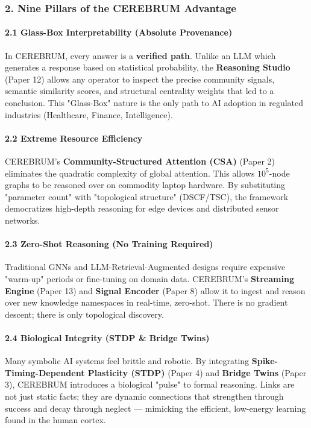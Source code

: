 \subsubsection{2. Nine Pillars of the CEREBRUM Advantage}

\paragraph{2.1 Glass-Box Interp\-retability (Absolute Provenance)}
In CEREBRUM, every answer is a \textbf{verified path}. Unlike an LLM which generates a response based on statistical probability, the \textbf{Reasoning Studio} (Paper 12) allows any operator to inspect the precise community signals, semantic similarity scores, and structural centrality weights that led to a conclusion. This "Glass-Box" nature is the only path to AI adoption in regulated industries (Healthcare, Finance, Intell\-igence).

\paragraph{2.2 Extreme Resource Efficiency}
CEREBRUM's \textbf{Community-Structured Attention (CSA)} (Paper 2) eliminates the quadratic complexity of global attention. This allows $10^5$-node graphs to be reasoned over on commodity laptop hardware. By subst\-ituting "parameter count" with "topological structure" (DSCF/TSC), the framework democ\-ratizes high-depth reasoning for edge devices and distributed sensor networks.

\paragraph{2.3 Zero-Shot Reasoning (No Training Required)}
Traditional GNNs and LLM-Retrieval-Augmented designs require expensive "warm-up" periods or fine-tuning on domain data. CEREBRUM's \textbf{Streaming Engine} (Paper 13) and \textbf{Signal Encoder} (Paper 8) allow it to ingest and reason over new knowledge namespaces in real-time, zero-shot. There is no gradient descent; there is only topological discovery.

\paragraph{2.4 Biological Integrity (STDP \& Bridge Twins)}
Many symbolic AI systems feel brittle and robotic. By integrating \textbf{Spike-Timing-Dependent Plasticity (STDP)} (Paper 4) and \textbf{Bridge Twins} (Paper 3), CEREBRUM introduces a biological "pulse" to formal reasoning. Links are not just static facts; they are dynamic connections that strengthen through success and decay through neglect — mimicking the efficient, low-energy learning found in the human cortex.

